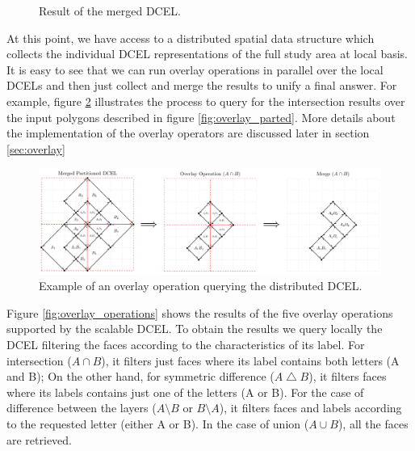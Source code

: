 \begin{figure}[!ht]
    \centering
        
    \caption{Result of the merged DCEL.}\label{fig:merged_dcel}
\end{figure}

At this point, we have access to a distributed spatial data structure which collects the individual DCEL representations of the full study area at local basis.  It is easy to see that we can run overlay operations in parallel over the local DCELs and then just collect and merge the results to unify a final answer.  For example, figure \ref{fig:overlay_parted2} illustrates the process to query for the intersection results over the input polygons described in figure \ref{fig:overlay_parted}.  More details about the implementation of the overlay operators are discussed later in section \ref{sec:overlay}

\begin{figure}[!ht]
    \centering
    \includegraphics[width=\linewidth]{figures/03-OverlayParted2}
    \caption{Example of an overlay operation querying the distributed DCEL.} \label{fig:overlay_parted2}
\end{figure}

Figure \ref{fig:overlay_operations} shows the results of the five overlay operations supported by the scalable DCEL.  To obtain the results we query locally the DCEL filtering the faces according to the characteristics of its label.  For intersection ($A \cap B$), it filters just faces where its label contains both letters (A and B); On the other hand, for symmetric difference ($A \bigtriangleup B$), it filters faces where its labels contains just one of the letters (A or B).  For the case of difference between the layers ($A \setminus B$ or $B \setminus A$), it filters faces and labels according to the requested letter (either A or B). In the case of union ($A \cup B$), all the faces are retrieved. 

